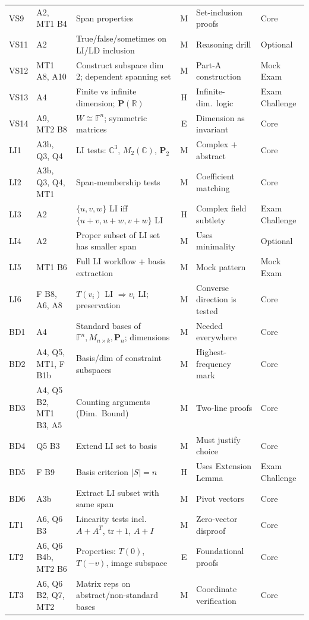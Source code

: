 {\begin{longtable}{@{}l p{2.6cm} p{5.2cm} c p{3.9cm} p{1.7cm}@{}}
VS9 & A2, MT1 B4 & Span properties & M & Set-inclusion proofs & Core\\
VS11 & A2 & True/false/sometimes on LI/LD inclusion & M & Reasoning drill & Optional\\
VS12 & MT1 A8, A10 & Construct subspace dim 2; dependent spanning set & M & Part-A construction & Mock Exam\\
VS13 & A4 & Finite vs infinite dimension; $\mathbf P(\mathbb R)$ & H & Infinite-dim.\ logic & Exam Challenge\\
VS14 & A9, MT2 B8 & $W\cong\mathbb F^n$; symmetric matrices & E & Dimension as invariant & Core\\
LI1 & A3b, Q3, Q4 & LI tests: $\mathbb C^3$, $M_2(\mathbb C)$, $\mathbf P_2$ & M & Complex $+$ abstract & Core\\
LI2 & A3b, Q3, Q4, MT1 & Span-membership tests & M & Coefficient matching & Core\\
LI3 & A2 & $\{u,v,w\}$ LI iff $\{u{+}v,u{+}w,v{+}w\}$ LI & H & Complex field subtlety & Exam Challenge\\
LI4 & A2 & Proper subset of LI set has smaller span & M & Uses minimality & Optional\\
LI5 & MT1 B6 & Full LI workflow + basis extraction & M & Mock pattern & Mock Exam\\
LI6 & F B8, A6, A8 & $T(v_i)$ LI $\Rightarrow v_i$ LI; preservation & M & Converse direction is tested & Core\\
BD1 & A4 & Standard bases of $\mathbb F^n,M_{n\times k},\mathbf P_n$; dimensions & M & Needed everywhere & Core\\
BD2 & A4, Q5, MT1, F B1b & Basis/dim of constraint subspaces & M & Highest-frequency mark & Core\\
BD3 & A4, Q5 B2, MT1 B3, A5 & Counting arguments (Dim.\ Bound) & M & Two-line proofs & Core\\
BD4 & Q5 B3 & Extend LI set to basis & M & Must justify choice & Core\\
BD5 & F B9 & Basis criterion $\lvert S\rvert=n$ & H & Uses Extension Lemma & Exam Challenge\\
BD6 & A3b & Extract LI subset with same span & M & Pivot vectors & Core\\
LT1 & A6, Q6 B3 & Linearity tests incl.\ $A{+}A^T$, $\mathrm{tr}{+}1$, $A{+}I$ & M & Zero-vector disproof & Core\\
LT2 & A6, Q6 B4b, MT2 B6 & Properties: $T(0)$, $T(-v)$, image subspace & E & Foundational proofs & Core\\
LT3 & A6, Q6 B2, Q7, MT2 & Matrix reps on abstract/non-standard bases & M & Coordinate verification & Core\\

\end{longtable}}
